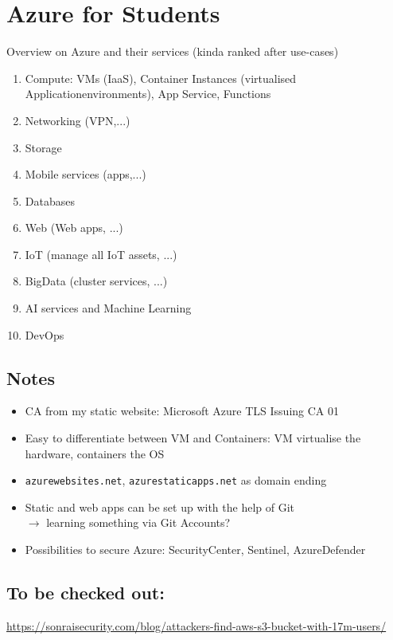 \documentclass[12pt]{article}
\begin{document}
\thispagestyle{firstpage}

\section*{Azure for Students}
Overview on Azure and their services (kinda ranked after use-cases)
\begin{enumerate}
    \item Compute: VMs (IaaS), Container Instances (virtualised Applicationenvironments), App Service, Functions
    \item Networking (VPN,...)
    \item Storage
    \item Mobile services (apps,...)
    \item Databases
    \item Web (Web apps, ...)
    \item IoT (manage all IoT assets, ...)
    \item BigData (cluster services, ...)
    \item AI services and Machine Learning
    \item DevOps
\end{enumerate}


\subsection*{Notes}
\begin{itemize}
    \item CA from my static website: Microsoft Azure TLS Issuing CA 01
    \item Easy to differentiate between VM and Containers: VM virtualise the hardware, containers the OS
    \item \verb|azurewebsites.net|, \verb|azurestaticapps.net| as domain ending
    \item Static and web apps can be set up with the help of Git \\ 
    $\rightarrow$ learning something via Git Accounts?
    \item Possibilities to secure Azure: SecurityCenter, Sentinel, AzureDefender
\end{itemize}

\subsection*{To be checked out:}
\url{https://sonraisecurity.com/blog/attackers-find-aws-s3-bucket-with-17m-users/} \\ \\
\end{document}
